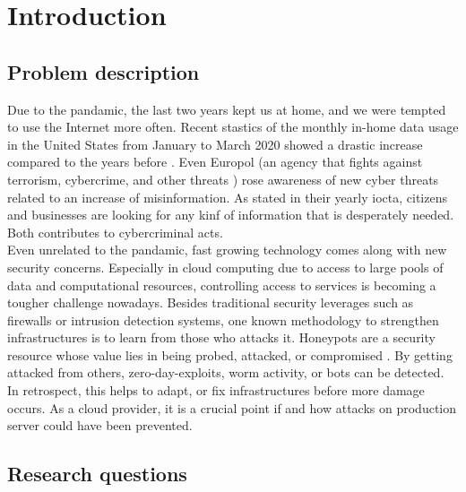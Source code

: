 \chapter{Introduction}

\section{Problem description}

Due to the pandamic, the last two years kept us at home, and we were tempted to use the Internet more often. Recent stastics of the monthly in-home data usage in the United States from January to March 2020 showed a drastic increase compared to the years before \cite{statista2021}. Even Europol (an agency that fights against terrorism, cybercrime, and other threats \cite{europol2021}) rose awareness of new cyber threats related to an increase of misinformation. As stated in their yearly \ac{iocta}, citizens and businesses are looking for any kinf of information that is desperately needed. Both contributes to cybercriminal acts. \cite{iocta2020}\\


Even unrelated to the pandamic, fast growing technology comes along with new security concerns. Especially in cloud computing due to access to large pools of data and computational resources, controlling access to services is becoming a tougher challenge nowadays. Besides traditional security leverages such as firewalls or intrusion detection systems, one known methodology to strengthen infrastructures is to learn from those who attacks it. Honeypots are a security resource whose value lies in being probed, attacked, or compromised \cite{Spitzner2003}. By getting attacked from others, zero-day-exploits, worm activity, or bots can be detected. In retrospect, this helps to adapt, or fix infrastructures before more damage occurs. As a cloud provider, it is a crucial point if and how attacks on production server could have been prevented. \\



\section{Research questions}

